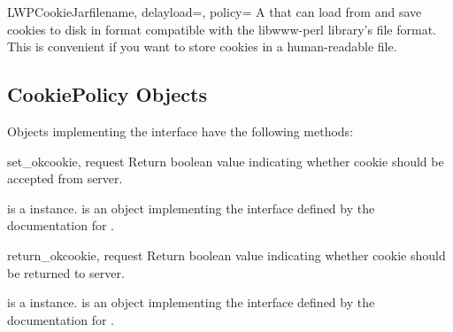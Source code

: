 \begin{classdesc}{LWPCookieJar}{filename, delayload=,
 policy=}
A  that can load from and save cookies to disk in
format compatible with the libwww-perl library's 
file format.  This is convenient if you want to store cookies in a
human-readable file.
\end{classdesc}


\subsection{CookiePolicy Objects \label{cookie-policy-objects}}

Objects implementing the  interface have the
following methods:

\begin{methoddesc}[CookiePolicy]{set_ok}{cookie, request}
Return boolean value indicating whether cookie should be accepted from server.

 is a  instance.   is
an object implementing the interface defined by the documentation for
.
\end{methoddesc}

\begin{methoddesc}[CookiePolicy]{return_ok}{cookie, request}
Return boolean value indicating whether cookie should be returned to server.

 is a  instance.   is
an object implementing the interface defined by the documentation for
.
\end{methoddesc}

